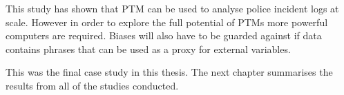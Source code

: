 This study has shown that PTM can be used to analyse police incident logs at scale. However in order to explore the full potential of PTMs more powerful computers are required. Biases will also have to be guarded against if data contains phrases that can be used as a proxy for external variables.

This was the final case study in this thesis. The next chapter summarises the results from all of the studies conducted.

